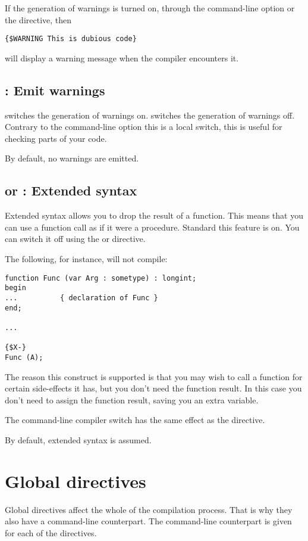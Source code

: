 If the generation of warnings is turned on, through the 
command-line option or the  directive, then
\begin{verbatim}
{$WARNING This is dubious code}
\end{verbatim}
will display a warning message when the compiler encounters it.

\subsection{ : Emit warnings}

 switches the generation of warnings on.
 switches the generation of warnings off.
Contrary to the command-line option  this
is a local switch, this is useful for checking parts of your code.

By default, no warnings are emitted.

\subsection{ or  : Extended syntax}

Extended syntax allows you to drop the result of a function. This means that
you can use a function call as if it were a procedure. Standard this feature
is on. You can switch it off using the  or
directive.

The following, for instance, will not compile:
\begin{verbatim}
function Func (var Arg : sometype) : longint;
begin
...          { declaration of Func }
end;

...

{$X-}
Func (A);
\end{verbatim}
The reason this construct is supported is that you may wish to call a
function for certain side-effects it has, but you don't need the function
result. In this case you don't need to assign the function result, saving
you an extra variable.

The command-line compiler switch  has the same effect as the
 directive.

By default, extended syntax is assumed.

\section{Global directives}
\label{se:GlobalSwitch}
Global directives affect the whole of the compilation process. That is why
they also have a command-line counterpart. The command-line counterpart is
given for each of the directives.

